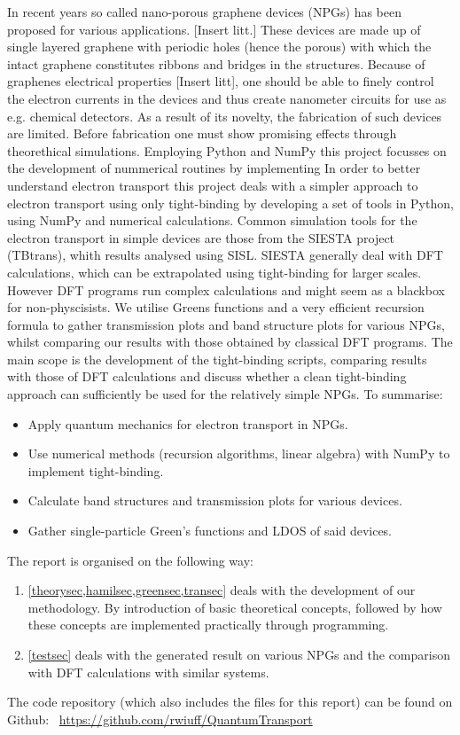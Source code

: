 In recent years so called nano-porous graphene devices (NPGs) has been proposed for various applications. [Insert litt.] These devices are made up of single layered graphene with periodic holes (hence the porous) with which the intact graphene constitutes ribbons and bridges in the structures. Because of graphenes electrical properties [Insert litt], one should be able to finely control the electron currents in the devices and thus create nanometer circuits for use as e.g. chemical detectors. As a result of its novelty, the fabrication of such devices are limited. Before fabrication one must show promising effects through theorethical simulations. Employing Python and NumPy this project focusses on the development of nummerical routines by implementing In order to better understand electron transport this project deals with a simpler approach to electron transport using only tight-binding by developing a set of tools in Python, using NumPy and numerical calculations. Common simulation tools for the electron transport in simple devices are those from the SIESTA project (TBtrans), whith results analysed using SISL\cite{zerothi_sisl}. SIESTA generally deal with DFT calculations, which can be extrapolated using tight-binding for larger scales\cite{calogero_electron_2019}. However DFT programs run complex calculations and might seem as a blackbox for non-physcisists. We utilise Greens functions and a very efficient recursion formula to gather transmission plots and band structure plots for various NPGs, whilst comparing our results with those obtained by classical DFT programs. The main scope is the development of the tight-binding scripts, comparing results with those of DFT calculations and discuss whether a clean tight-binding approach can sufficiently be used for the relatively simple NPGs.
To summarise:
\begin{itemize}
    \item Apply quantum mechanics for electron transport in NPGs.
    \item Use numerical methods (recursion algorithms, linear algebra) with NumPy to implement tight-binding.
    \item Calculate band structures and transmission plots for various devices.
    \item Gather single-particle Green’s functions and LDOS of said devices.
\end{itemize}
The report is organised on the following way:
\begin{enumerate}
    \item \cref{theorysec,hamilsec,greensec,transec} deals with the development of our methodology. By introduction of basic theoretical concepts, followed by how these concepts are implemented practically through programming. 
    \item \cref{testsec} deals with the generated result on various NPGs and the comparison with DFT calculations with similar systems.
\end{enumerate}
The code repository (which also includes the \latex files for this report) can be found on Github: \faGithub \ \url{https://github.com/rwiuff/QuantumTransport}
